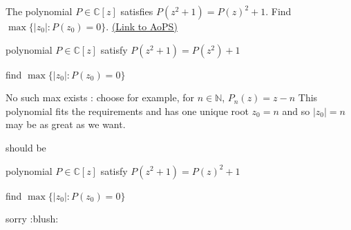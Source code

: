 \begin{problem}
	The polynomial $P\in\mathbb{C}[z]$ satisfies $P(z^2+1)=P(z)^2+1$. Find $ \max\{|z_0| : P(z_0)=0\}$.
	\flushright \href{https://artofproblemsolving.com/community/c6h351393}{(Link to AoPS)}
\end{problem}



\begin{solution}
	\begin{tcolorbox}polynomial $P\in\mathbb{C}[z]$ satisfy $P(z^2+1)=P(z^2)+1$

find $\max\{|z_0| : P(z_0)=0\}$\end{tcolorbox}

No such max exists : choose for example, for $n\in\mathbb N$, $P_n(z)=z-n$ This polynomial fits the requirements and has one unique root $z_0=n$ and so $|z_0|=n$ may be as great as we want.
\end{solution}



\begin{solution}
	should be

polynomial $P\in\mathbb{C}[z]$ satisfy $P(z^2+1)=P(z)^2+1$

find $\max\{|z_0| : P(z_0)=0\}$

sorry  :blush:
\end{solution}



